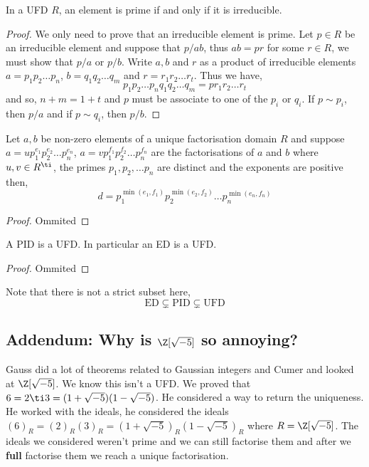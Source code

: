\begin{nprop}
   In a UFD $R$, an element is prime if and only if it is irreducible.
\end{nprop}
\begin{proof}
  We only need to prove that an irreducible element is prime. Let $p \in R$ be an irreducible element and suppose that $p/ab$, thus $ab = pr$ for some $r \in R$, we must show that $p/a$ or $p/b$. Write $a,b$ and $r$ as a product of irreducible elements $a = p_1p_2 \dots p_n$, $b = q_1q_2\dots q_m$ and $r = r_1r_2 \dots r_t$. Thus we have,
  $$ p_1p_2\dots p_nq_1q_2\dots q_m = pr_1r_2 \dots r_t $$
  and so, $n + m = 1 + t$ and $p$ must be associate to one of the $p_i$ or $q_i$. If $p \sim p_i$, then $p/a$ and if $p \sim q_i$, then $p/b$.
\end{proof}

\begin{nprop}
   Let $a, b$ be non-zero elements of a unique factorisation domain $R$ and suppose $a = up_1^{e_1}p_2^{e_2} \dots p_n^{e_n}$, $a = vp_1^{f_1}p_2^{f_2} \dots p_n^{f_n}$ are the factorisations of $a$ and $b$ where $u,v \in R^\ti$, the primes $p_1, p_2, \dots p_n$ are distinct and the exponents are positive then,
   $$ d = p_1^{\min(e_1, f_1)}p_2^{\min(e_2, f_2)}\dots p_n^{\min(e_n, f_n)} $$
\end{nprop}
\begin{proof}
  Ommited
\end{proof}

\begin{nthm}
  A PID is a UFD. In particular an ED is a UFD.
\end{nthm}
\begin{proof}
  Ommited
\end{proof}

\begin{remark}
   Note that there is not a strict subset here,
   $$ \mathrm{ED} \subsetneq \mathrm{PID} \subsetneq \mathrm{UFD} $$
\end{remark}

\subsection{Addendum: Why is $\Z[\sqrt{-5}]$ so annoying?}
Gauss did a lot of theorems related to Gaussian integers and Cumer and looked at $\Z[\sqrt{-5}]$. We know this isn't a UFD. We proved that $6 = 2 \ti 3 = (1 + \sqrt{-5})(1 - \sqrt{-5})$. He considered a way to return the uniqueness. He worked with the ideals, he considered the ideals $(6)_R = (2)_R(3)_R = (1 + \sqrt{-5})_R(1 - \sqrt{-5})_R$ where $R = \Z[\sqrt{-5}]$. The ideals we considered weren't prime and we can still factorise them and after we \textbf{full} factorise them we reach a unique factorisation.\\

